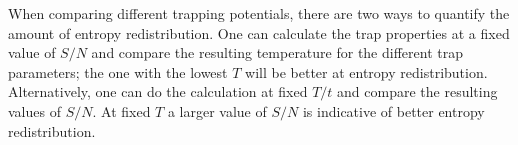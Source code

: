 %


When comparing different trapping potentials, there are two ways to quantify
the amount of entropy redistribution.  One can calculate the trap properties at
a fixed value of $S/N$ and compare the resulting temperature for the different
trap parameters;  the one with the lowest $T$ will be better at entropy
redistribution.   Alternatively, one can do the calculation at fixed $T/t$ and
compare the resulting values of $S/N$.  At fixed $T$ a larger value of $S/N$ is
indicative of better entropy redistribution. 


%
%
%

